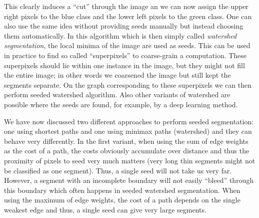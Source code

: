 This clearly induces a ``cut'' through the image an we can now assign the upper
right pixels to the blue class and the lower left pixels to the green class. One
can also use the same idea without providing seeds manually but instead choosing
them automatically. In this algorithm which is then simply called
\emph{watershed segmentation}, the local minima of the image are used as
seeds. This can be used in practice to find so called ``superpixels'' to
coarse-grain a computation. These superpixels should lie within one instance in
the image, but they might not fill the entire image; in other words we coarsened
the image but still kept the segments separate. On the graph corresponding to
these superpixels we can then perform seeded watershed algorithm. Also other
variants of watershed are possible where the seeds are found, for example, by a
deep learning method.

We have now discussed two different approaches to perform seeded segmentation:
one using shortest paths and one using minimax paths (watershed) and they can
behave very differently. In the first variant, \ie when using the sum of edge
weights as the cost of a path, the costs obviously accumulate over distance and
thus the proximity of pixels to seed very much matters (\eg very long thin
segments might not be classified as one segment). Thus, a single seed will not
take us very far. However, a segment with an incomplete boundary will not easily
``bleed'' through this boundary which often happens in seeded watershed
segmentation. When using the maximum of edge weights, the cost of a path depends
on the single weakest edge and thus, a single seed can give very large segments.


